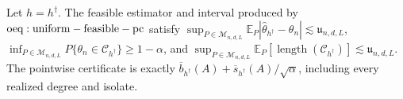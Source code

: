 Let \(h=h^\dagger\). The feasible estimator and interval produced by \({\rm oeq:uniform-feasible-pc}\) satisfy \(\sup_{P\in\mathcal M_{n,d,L}}\mathbb E_P|\widehat\theta_{h^\dagger}-\theta_n|\lesssim\mathfrak u_{n,d,L}\), \(\inf_{P\in\mathcal M_{n,d,L}}P\{\theta_n\in\mathcal C_{h^\dagger}\}\ge1-\alpha\), and \(\sup_{P\in\mathcal M_{n,d,L}}\mathbb E_P[\operatorname{length}(\mathcal C_{h^\dagger})]\lesssim\mathfrak u_{n,d,L}\). The pointwise certificate is exactly \(\overline b_{h^\dagger}(A)+\overline s_{h^\dagger}(A)/\sqrt\alpha\), including every realized degree and isolate.